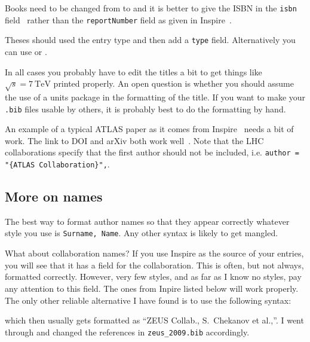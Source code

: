 Books need to be changed from  to
 and it is better to give the ISBN in the \texttt{isbn}
field~\cite{Halzen:1984mc-final} rather than the \texttt{reportNumber}
field as given in Inspire~\cite{Halzen:1984mc-inspire}.

Theses should used the  entry type and
then add a \texttt{type} field. Alternatively you can use
 or .

In all cases you probably have to edit the titles a bit to get
things like \(\sqrt{s} = \SI{7}{\TeV}\) printed properly. An open
question is whether you should assume the use of a units package in
the formatting of the title. If you want to make your \texttt{.bib}
files usable by others, it is probably best to do the formatting by
hand.

An example of a typical ATLAS paper as it comes from
Inspire~\cite{Aad:2010ey-inspire} needs a bit of work.
The link to DOI and arXiv both work well~\cite{Aad:2010ey-final}.
Note that the LHC collaborations specify that the first author should not
be included, i.e. \verb|author = "{ATLAS Collaboration}",|.


\subsection{More on names}%
\label{sec:ref:names}

The best way to format author names so that they appear correctly
whatever \BibTeX{} style you use is \texttt{Surname, Name}. Any other
syntax is likely to get mangled.

What about collaboration names? If you use Inspire as the source of
your \BibTeX{} entries, you will see that it has a field for the
collaboration. This is often, but not always, formatted
correctly. 
However, very few \BibTeX{} styles, and as far as I know no  styles, 
pay any attention to this field.
The ones from Inpire listed below will work properly. The
only other reliable alternative I have found is to use the following
syntax:
\begin{tcblisting}{listing only}
@Article{Chekanov:2009qja,
     author    = "{ZEUS Collab.} and Chekanov, S. and others",
\end{tcblisting}
which then usually gets formatted as \enquote{ZEUS Collab., S.\ Chekanov et
al.,}.
I went through and changed the references in \texttt{zeus\_2009.bib}
accordingly.


